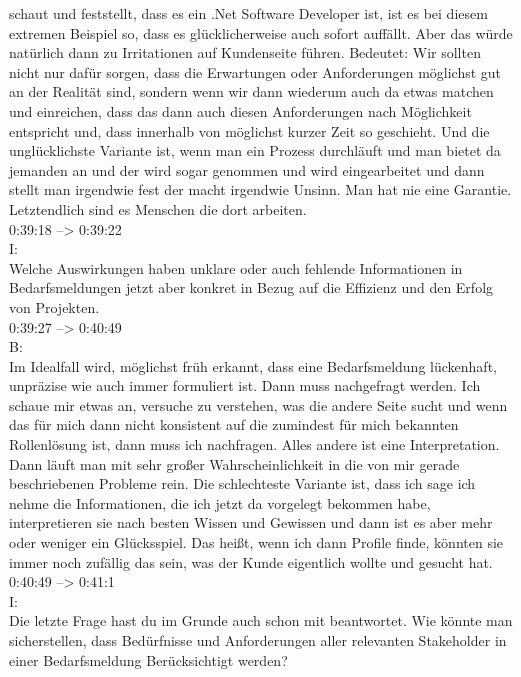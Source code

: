 schaut und feststellt, dass es ein .Net Software Developer ist, ist es bei diesem extremen Beispiel so, dass es glücklicherweise auch sofort auffällt. Aber das würde natürlich dann zu Irritationen auf Kundenseite führen. Bedeutet: Wir sollten nicht nur dafür sorgen, dass die Erwartungen oder Anforderungen möglichst gut an der Realität sind, sondern wenn wir dann wiederum auch da etwas matchen und einreichen, dass das dann auch diesen Anforderungen nach Möglichkeit entspricht und, dass innerhalb von möglichst kurzer Zeit so geschieht. Und die unglücklichste Variante ist, wenn man ein Prozess durchläuft und man bietet da jemanden an und der wird sogar genommen und wird eingearbeitet und dann stellt man irgendwie fest der macht irgendwie Unsinn. Man hat nie eine Garantie. Letztendlich sind es Menschen die dort arbeiten.\\

0:39:18 --> 0:39:22\\
I:\\
Welche Auswirkungen haben unklare oder auch fehlende Informationen in Bedarfsmeldungen jetzt aber konkret in Bezug auf die Effizienz und den Erfolg von Projekten.\\

0:39:27 --> 0:40:49\\
B:\\
Im Idealfall wird, möglichst früh erkannt, dass eine Bedarfsmeldung lückenhaft, unpräzise wie auch immer formuliert ist. Dann muss nachgefragt werden. Ich schaue mir etwas an, versuche zu verstehen, was die andere Seite sucht und wenn das für mich dann nicht konsistent auf die zumindest für mich bekannten Rollenlösung ist, dann muss ich nachfragen. Alles andere ist eine Interpretation. Dann läuft man mit sehr großer Wahrscheinlichkeit in die von mir gerade beschriebenen Probleme rein. Die schlechteste Variante ist, dass ich sage ich nehme die Informationen, die ich jetzt da vorgelegt bekommen habe, interpretieren sie nach besten Wissen und Gewissen und dann ist es aber mehr oder weniger ein Glücksspiel. Das heißt, wenn ich dann Profile finde, könnten sie immer noch zufällig das sein, was der Kunde eigentlich wollte und gesucht hat.\\

0:40:49 --> 0:41:1\\
I:\\
Die letzte Frage hast du im Grunde auch schon mit beantwortet. Wie könnte man sicherstellen, dass Bedürfnisse und Anforderungen aller relevanten Stakeholder in einer Bedarfsmeldung Berücksichtigt werden?\\

